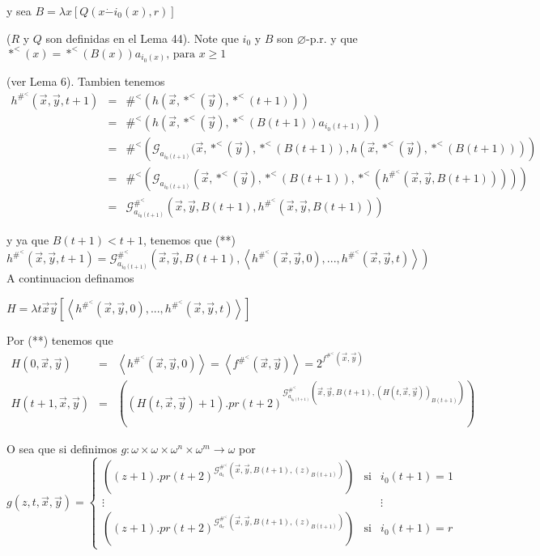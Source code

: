 y sea
\(\displaystyle B=\lambda x\left[ Q(x\dot{-}i_{0}(x),r)\right] \)

(\(R\) y \(Q\) son definidas en el Lema 44). Note que \(i_{0}\) y \(B\) son \(\varnothing \)-p.r. y que
\(\displaystyle \ast ^{< }(x)=\ast ^{< }(B(x))a_{i_{0}(x)}\text{, para }x\geq 1 \)

(ver Lema 6). Tambien tenemos
\(\displaystyle \begin{array}{rcl} h^{\#^{< }}(\vec{x},\vec{y},t+1) & =& \#^{< }(h(\vec{x},\ast ^{< }(\vec{y}),\ast ^{< }(t+1))) \\ & =& \#^{< }(h(\vec{x},\ast ^{< }(\vec{y}),\ast ^{< }(B(t+1))a_{i_{0}(t+1)})) \\ & =& \#^{< }\left( \mathcal{G}_{a_{i_{0}(t+1)}}(\vec{x},\ast ^{< }(\vec{y}),\ast ^{< }(B(t+1)),h(\vec{x},\ast ^{< }(\vec{y}),\ast ^{< }(B(t+1)))\right) \\ & =& \#^{< }\left( \mathcal{G}_{a_{i_{0}(t+1)}}(\vec{x},\ast ^{< }(\vec{y}),\ast ^{< }(B(t+1)),\ast ^{< }(h^{\#^{< }}(\vec{x},\vec{y},B(t+1))))\right) \\ & =& \mathcal{G}_{a_{i_{0}(t+1)}}^{\#^{< }}(\vec{x},\vec{y},B(t+1),h^{\#^{< }}( \vec{x},\vec{y},B(t+1))) \end{array} \)

y ya que \(B(t+1)< t+1\), tenemos que
(**) \(h^{\#^{< }}(\vec{x},\vec{y},t+1)=\mathcal{G}_{a_{i_{0}(t+1)}}^{ \#^{< }}(\vec{x},\vec{y},B(t+1),\left\langle h^{\#^{< }}(\vec{x},\vec{y} ,0),...,h^{\#^{< }}(\vec{x},\vec{y},t)\right\rangle )\)
A continuacion definamos

\(\displaystyle H=\lambda t\vec{x}\vec{y}\left[ \left\langle h^{\#^{< }}(\vec{x},\vec{y} ,0),...,h^{\#^{< }}(\vec{x},\vec{y},t)\right\rangle \right] \)

Por (**) tenemos que
\(\displaystyle \begin{array}{rcl} H(0,\vec{x},\vec{y}) & =& \left\langle h^{\#^{< }}(\vec{x},\vec{y} ,0)\right\rangle =\left\langle f^{\#^{< }}(\vec{x},\vec{y})\right\rangle =2^{f^{\#^{< }}(\vec{x},\vec{y})} \\ H(t+1,\vec{x},\vec{y}) & =& \left( (H(t,\vec{x},\vec{y})+1).pr(t+2)^{\mathcal{G }_{a_{i_{0}(t+1)}}^{\#^{< }}(\vec{x},\vec{y},B(t+1),(H(t,\vec{x},\vec{y} ))_{B(t+1)})}\right) \end{array} \)

O sea que si definimos \(g:\omega \times \omega \times \omega ^{n}\times \omega ^{m}\rightarrow \omega \) por
\(\displaystyle g(z,t,\vec{x},\vec{y})=\left\{ \begin{array}{clc} \left( (z+1).pr(t+2)^{\mathcal{G}_{a_{1}}^{\#^{< }}(\vec{x},\vec{y} ,B(t+1),(z)_{B(t+1)})}\right) & \text{si} & i_{0}(t+1)=1 \\ \vdots & & \vdots \\ \left( (z+1).pr(t+2)^{\mathcal{G}_{a_{r}}^{\#^{< }}(\vec{x},\vec{y} ,B(t+1),(z)_{B(t+1)})}\right) & \text{si} & i_{0}(t+1)=r \end{array} \right. \)

